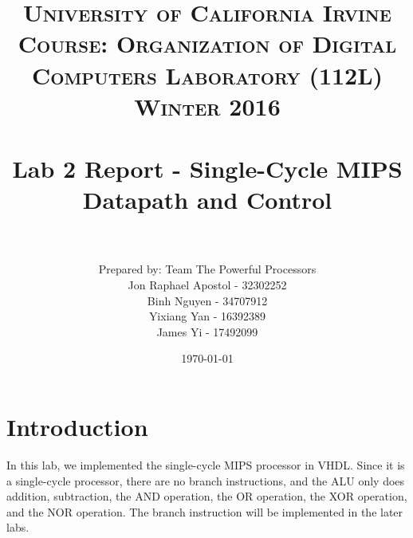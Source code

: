 \documentclass[paper=letter, fontsize=11pt]{scrartcl} %
\title{	
\normalfont \normalsize 
\textsc{University of California Irvine} 
\textsc{Course: Organization of Digital Computers Laboratory (112L) \\ Winter 2016} \\ [25pt]
\horrule{0.5pt} \\[0.4cm] %
\huge Lab 2 Report - Single-Cycle MIPS Datapath and Control\\
\horrule{2pt} \\[0.5cm] %
}
\author{Prepared by: Team The Powerful Processors \\ Jon Raphael Apostol - 32302252 \\ Binh Nguyen - 34707912 \\ Yixiang Yan - 16392389 \\ James Yi - 17492099 } %
\date{\normalsize\today} %
\numberwithin{equation}{section}
\numberwithin{figure}{section}
\numberwithin{table}{section}
\begin{document}
\maketitle %


\section{Introduction}
In this lab, we implemented the single-cycle MIPS processor in VHDL. Since it is a single-cycle processor, there are no branch instructions, and the ALU only does addition, subtraction, the AND operation, the OR operation, the XOR operation, and the NOR operation. The branch instruction will be implemented in the later labs.

\pagebreak

\end{document}
